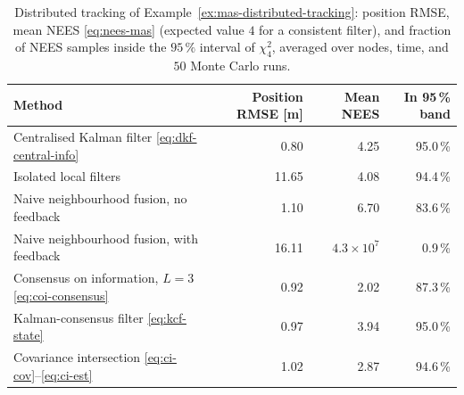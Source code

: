\documentclass[graybox,envcountchap]{style/SNmono}
\begin{document}
\begin{table}[!t]
\centering
\small
\caption{Distributed tracking of Example~\ref{ex:mas-distributed-tracking}: position RMSE, mean NEES \eqref{eq:nees-mas} (expected value $4$ for a consistent filter), and fraction of NEES samples inside the $95\,\%$ interval of $\chi^{2}_{4}$, averaged over nodes, time, and $50$ Monte Carlo runs.}
\label{tab:mas-distributed-tracking}
\begin{tabular}{lrrr}
\hline
\textbf{Method} & \textbf{Position RMSE [m]} & \textbf{Mean NEES} & \textbf{In 95\,\% band} \\
\hline
Centralised Kalman filter \eqref{eq:dkf-central-info} & 0.80 & 4.25 & 95.0\,\% \\
Isolated local filters & 11.65 & 4.08 & 94.4\,\% \\
Naive neighbourhood fusion, no feedback & 1.10 & 6.70 & 83.6\,\% \\
Naive neighbourhood fusion, with feedback & 16.11 & $4.3\times10^{7}$ & 0.9\,\% \\
Consensus on information, $L=3$ \eqref{eq:coi-consensus} & 0.92 & 2.02 & 87.3\,\% \\
Kalman-consensus filter \eqref{eq:kcf-state} & 0.97 & 3.94 & 95.0\,\% \\
Covariance intersection \eqref{eq:ci-cov}--\eqref{eq:ci-est} & 1.02 & 2.87 & 94.6\,\% \\
\hline
\end{tabular}
\end{table}
\end{document}
